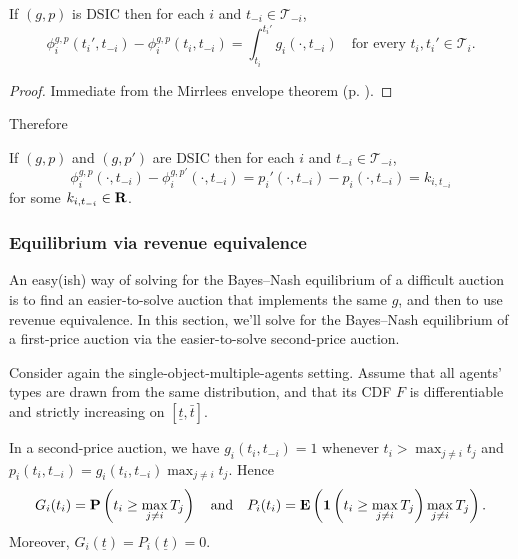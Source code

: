 \documentclass[11pt,letterpaper,reqno,oneside]{article}
\begin{document}
\begin{corollary}
	\label{corollary:IC_envelope_1d_DSIC}
	If $(g,p)$ is DSIC then for each $i$ and $t_{-i} \in \mathcal{T}_{-i}$,
	\begin{equation*}
		\phi^{g,p}_i(t_i',t_{-i}) - \phi^{g,p}_i(t_i,t_{-i}) 
		= \int_{t_i}^{t_i'} g_i(\cdot,t_{-i})
		\quad\text{for every $t_i,t_i' \in \mathcal{T}_i$} .
	\end{equation*}
\end{corollary}

\begin{proof}
	Immediate from the Mirrlees envelope theorem (p. \pageref{theorem:IC_envelope_1d}).
\end{proof}


Therefore
%
\begin{corollary}
	If $(g,p)$ and $(g,p')$ are DSIC then for each $i$ and $t_{-i} \in \mathcal{T}_{-i}$,
	\begin{equation*}
		\phi^{g,p}_i(\cdot,t_{-i}) - \phi^{g,p'}_i(\cdot,t_{-i}) 
		= p_i'(\cdot,t_{-i}) - p_i(\cdot,t_{-i}) 
		= k_{i,t_{-i}}
	\end{equation*}
	for some $k_{i,t_{-i}} \in \mathbf{R}$.
\end{corollary}



\subsubsection{Equilibrium via revenue equivalence}
\label{sec:mech_desi:several_agents_one_dimension:first-price_auction}

An easy(ish) way of solving for the Bayes--Nash equilibrium of a difficult auction is to find an easier-to-solve auction that implements the same $g$, and then to use revenue equivalence. In this section, we'll solve for the Bayes--Nash equilibrium of a first-price auction via the easier-to-solve second-price auction.

Consider again the single-object-multiple-agents setting. Assume that all agents' types are drawn from the same distribution, and that its CDF $F$ is differentiable and strictly increasing on $\left[ \underline{t}, \bar{t} \right]$.

In a second-price auction, we have $g_i(t_i,t_{-i}) = 1$ whenever $t_i > \max_{j \neq i} t_j$ and $p_i(t_i,t_{-i}) = g_i(t_i,t_{-i}) \max_{j \neq i} t_j$. Hence
%
\begin{equation*}
	G_i(t_i) = \mathbf{P}\left( t_i \geq \max_{j \neq i} T_j \right)
	\quad\text{and}\quad
	P_i(t_i) 
	= \mathbf{E}\left( \boldsymbol{1}\left( t_i \geq \max_{j \neq i} T_j \right) 
	\max_{j \neq i} T_j \right) .
\end{equation*}
%
Moreover, $G_i\left( \underline{t} \right) = P_i\left( \underline{t} \right) = 0$.
\end{document}
